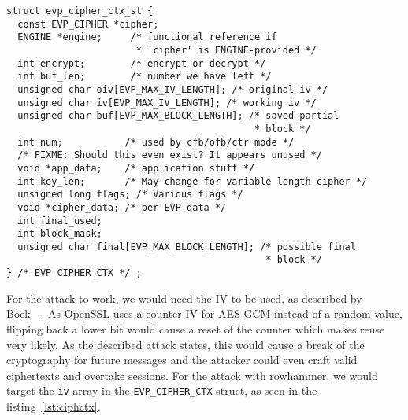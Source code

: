 \begin{minipage}{\linewidth}
\begin{lstlisting}[style=CStyle,
                   caption={Context struct describing the Cipher used in TLS.
This struct is used as the SSL context inside OpenSSL. Source is taken from
OpenSSL version $1.1.0g$},
                   label={lst:ciphctx}]
struct evp_cipher_ctx_st {
  const EVP_CIPHER *cipher;
  ENGINE *engine;     /* functional reference if
                       * 'cipher' is ENGINE-provided */
  int encrypt;        /* encrypt or decrypt */
  int buf_len;        /* number we have left */
  unsigned char oiv[EVP_MAX_IV_LENGTH]; /* original iv */
  unsigned char iv[EVP_MAX_IV_LENGTH]; /* working iv */
  unsigned char buf[EVP_MAX_BLOCK_LENGTH]; /* saved partial
                                            * block */
  int num;           /* used by cfb/ofb/ctr mode */
  /* FIXME: Should this even exist? It appears unused */
  void *app_data;    /* application stuff */
  int key_len;       /* May change for variable length cipher */
  unsigned long flags; /* Various flags */
  void *cipher_data; /* per EVP data */
  int final_used;
  int block_mask;
  unsigned char final[EVP_MAX_BLOCK_LENGTH]; /* possible final
                                              * block */
} /* EVP_CIPHER_CTX */ ;
\end{lstlisting}
\end{minipage}

For the attack to work, we would need the IV to be used, as described by
Böck~\etal~\cite{gcmnonceattack}. As OpenSSL uses a counter IV for AES-GCM
instead of a random value, flipping back a lower bit would cause a reset of the
counter which makes reuse very likely. As the described attack states, this
would cause a break of the cryptography for future messages and the attacker
could even craft valid ciphertexts and overtake sessions. For the attack with
rowhammer, we would target the \texttt{iv} array in the
\texttt{EVP\_CIPHER\_CTX} struct, as seen in the listing~\ref{lst:ciphctx}.

